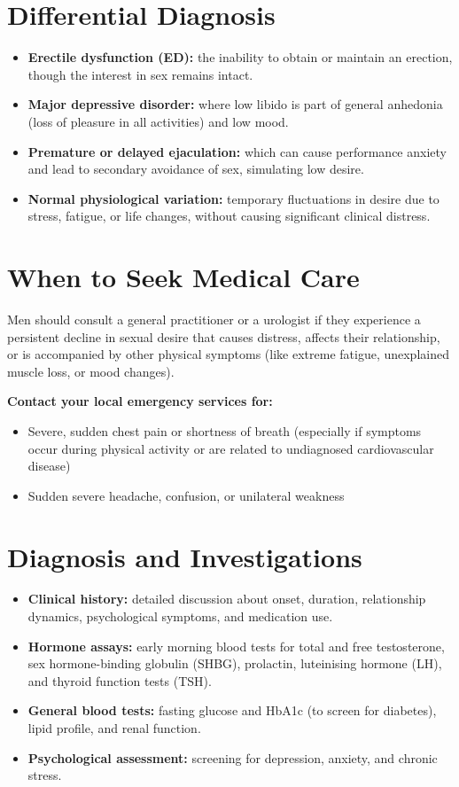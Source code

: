\section*{Differential Diagnosis}
\begin{itemize}
    \item \textbf{Erectile dysfunction (ED):} the inability to obtain or maintain an erection, though the interest in sex remains intact.
    \item \textbf{Major depressive disorder:} where low libido is part of general anhedonia (loss of pleasure in all activities) and low mood.
    \item \textbf{Premature or delayed ejaculation:} which can cause performance anxiety and lead to secondary avoidance of sex, simulating low desire.
    \item \textbf{Normal physiological variation:} temporary fluctuations in desire due to stress, fatigue, or life changes, without causing significant clinical distress.
\end{itemize}

\section*{When to Seek Medical Care}
Men should consult a general practitioner or a urologist if they experience a persistent decline in sexual desire that causes distress, affects their relationship, or is accompanied by other physical symptoms (like extreme fatigue, unexplained muscle loss, or mood changes).

\textbf{Contact your local emergency services for:}
\begin{itemize}
    \item Severe, sudden chest pain or shortness of breath (especially if symptoms occur during physical activity or are related to undiagnosed cardiovascular disease)
    \item Sudden severe headache, confusion, or unilateral weakness
\end{itemize}

\section*{Diagnosis and Investigations}
\begin{itemize}
    \item \textbf{Clinical history:} detailed discussion about onset, duration, relationship dynamics, psychological symptoms, and medication use.
    \item \textbf{Hormone assays:} early morning blood tests for total and free testosterone, sex hormone-binding globulin (SHBG), prolactin, luteinising hormone (LH), and thyroid function tests (TSH).
    \item \textbf{General blood tests:} fasting glucose and HbA1c (to screen for diabetes), lipid profile, and renal function.
    \item \textbf{Psychological assessment:} screening for depression, anxiety, and chronic stress.
\end{itemize}

